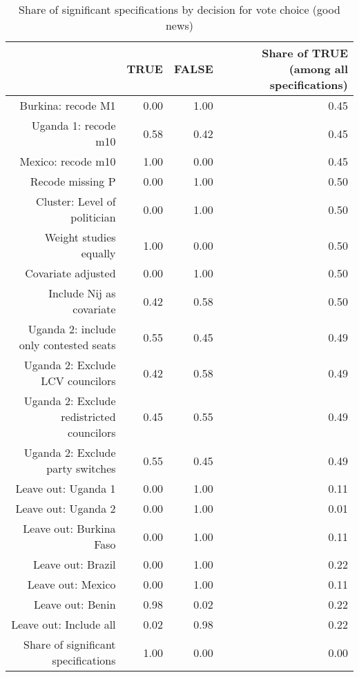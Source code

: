 \begin{table}[ht]
\centering
\caption{Share of significant specifications by decision for vote choice (good news)} 
\label{tab:spec_m1g}
\begin{tabular}{rrrr}
  \hline
 & TRUE & FALSE & Share of TRUE (among all specifications) \\ 
  \hline
Burkina: recode M1 & 0.00 & 1.00 & 0.45 \\ 
  Uganda 1: recode m10 & 0.58 & 0.42 & 0.45 \\ 
  Mexico: recode m10 & 1.00 & 0.00 & 0.45 \\ 
  Recode missing P & 0.00 & 1.00 & 0.50 \\ 
  Cluster: Level of politician & 0.00 & 1.00 & 0.50 \\ 
  Weight studies equally & 1.00 & 0.00 & 0.50 \\ 
  Covariate adjusted & 0.00 & 1.00 & 0.50 \\ 
  Include Nij as covariate & 0.42 & 0.58 & 0.50 \\ 
  Uganda 2: include only contested seats & 0.55 & 0.45 & 0.49 \\ 
  Uganda 2: Exclude LCV councilors & 0.42 & 0.58 & 0.49 \\ 
  Uganda 2: Exclude redistricted councilors & 0.45 & 0.55 & 0.49 \\ 
  Uganda 2: Exclude party switches & 0.55 & 0.45 & 0.49 \\ 
  Leave out: Uganda 1 & 0.00 & 1.00 & 0.11 \\ 
  Leave out: Uganda 2 & 0.00 & 1.00 & 0.01 \\ 
  Leave out: Burkina Faso & 0.00 & 1.00 & 0.11 \\ 
  Leave out: Brazil & 0.00 & 1.00 & 0.22 \\ 
  Leave out: Mexico & 0.00 & 1.00 & 0.11 \\ 
  Leave out: Benin & 0.98 & 0.02 & 0.22 \\ 
  Leave out: Include all & 0.02 & 0.98 & 0.22 \\ 
  Share of significant specifications & 1.00 & 0.00 & 0.00 \\ 
   \hline
\end{tabular}
\end{table}
